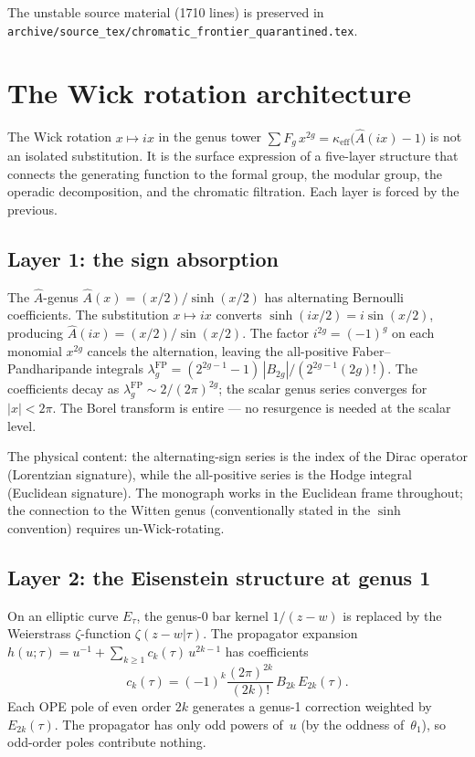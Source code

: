 \documentclass[11pt]{article}
\begin{document}
The unstable source material (1710 lines) is preserved in
\texttt{archive/source\_tex/chromatic\_frontier\_quarantined.tex}.

\section{The Wick rotation architecture}
\label{sec:wick-architecture}

The Wick rotation $x \mapsto ix$ in the genus tower
$\sum F_g\,x^{2g} = \kappa_{\mathrm{eff}}\bigl(\hat{A}(ix) - 1\bigr)$
is not an isolated substitution.  It is the surface expression
of a five-layer structure that connects the generating function
to the formal group, the modular group, the operadic decomposition,
and the chromatic filtration.  Each layer is forced by the previous.

\subsection{Layer 1: the sign absorption}

The $\hat{A}$-genus $\hat{A}(x) = (x/2)/\sinh(x/2)$ has
alternating Bernoulli coefficients.  The substitution $x \mapsto ix$
converts $\sinh(ix/2) = i\sin(x/2)$, producing
$\hat{A}(ix) = (x/2)/\sin(x/2)$.
The factor $i^{2g} = (-1)^g$ on each monomial $x^{2g}$
cancels the alternation, leaving the all-positive
Faber--Pandharipande integrals
$\lambda_g^{\mathrm{FP}} = (2^{2g-1}-1)\,|B_{2g}|/(2^{2g-1}(2g)!)$.
The coefficients decay as $\lambda_g^{\mathrm{FP}} \sim 2/(2\pi)^{2g}$;
the scalar genus series converges for $|x| < 2\pi$.  The Borel
transform is entire --- no resurgence is needed at the scalar level.

The physical content: the alternating-sign series is the index
of the Dirac operator (Lorentzian signature), while the all-positive
series is the Hodge integral (Euclidean signature).  The monograph
works in the Euclidean frame throughout; the connection to the
Witten genus (conventionally stated in the $\sinh$ convention)
requires un-Wick-rotating.

\subsection{Layer 2: the Eisenstein structure at genus 1}

On an elliptic curve $E_\tau$, the genus-0 bar kernel
$1/(z-w)$ is replaced by the Weierstrass $\zeta$-function
$\zeta(z{-}w|\tau)$.  The propagator expansion
$h(u;\tau) = u^{-1} + \sum_{k \ge 1} c_k(\tau)\,u^{2k-1}$
has coefficients
\[
c_k(\tau) = (-1)^k \frac{(2\pi)^{2k}}{(2k)!}\,B_{2k}\,E_{2k}(\tau).
\]
Each OPE pole of even order $2k$ generates a genus-1 correction
weighted by $E_{2k}(\tau)$.  The propagator has only odd powers
of~$u$ (by the oddness of~$\theta_1$), so odd-order poles contribute
nothing.
\end{document}
